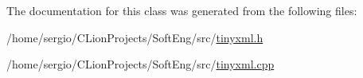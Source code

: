 The documentation for this class was generated from the following files\+:\begin{DoxyCompactItemize}
\item 
/home/sergio/\+C\+Lion\+Projects/\+Soft\+Eng/src/\hyperlink{tinyxml_8h}{tinyxml.\+h}\item 
/home/sergio/\+C\+Lion\+Projects/\+Soft\+Eng/src/\hyperlink{tinyxml_8cpp}{tinyxml.\+cpp}\end{DoxyCompactItemize}
